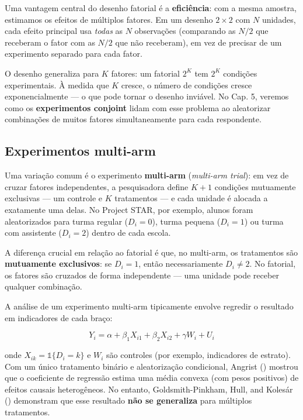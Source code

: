 \documentclass[
]{article}
\begin{document}
Uma vantagem central do desenho fatorial é a \textbf{eficiência}: com a mesma amostra, estimamos os efeitos de múltiplos fatores. Em um desenho \(2 \times 2\) com \(N\) unidades, cada efeito principal usa \emph{todas} as \(N\) observações (comparando as \(N/2\) que receberam o fator com as \(N/2\) que não receberam), em vez de precisar de um experimento separado para cada fator.

O desenho generaliza para \(K\) fatores: um fatorial \(2^K\) tem \(2^K\) condições experimentais. À medida que \(K\) cresce, o número de condições cresce exponencialmente --- o que pode tornar o desenho inviável. No Cap. 5, veremos como os \textbf{experimentos conjoint} lidam com esse problema ao aleatorizar combinações de muitos fatores simultaneamente para cada respondente.

\subsection{Experimentos multi-arm}\label{experimentos-multi-arm}

Uma variação comum é o experimento \textbf{multi-arm} (\emph{multi-arm trial}): em vez de cruzar fatores independentes, a pesquisadora define \(K+1\) condições mutuamente exclusivas --- um controle e \(K\) tratamentos --- e cada unidade é alocada a exatamente uma delas. No Project STAR, por exemplo, alunos foram aleatorizados para turma regular (\(D_i = 0\)), turma pequena (\(D_i = 1\)) ou turma com assistente (\(D_i = 2\)) dentro de cada escola.

A diferença crucial em relação ao fatorial é que, no multi-arm, os tratamentos são \textbf{mutuamente exclusivos}: se \(D_i = 1\), então necessariamente \(D_i \neq 2\). No fatorial, os fatores são cruzados de forma independente --- uma unidade pode receber qualquer combinação.

A análise de um experimento multi-arm tipicamente envolve regredir o resultado em indicadores de cada braço:

\[Y_i = \alpha + \beta_1 X_{i1} + \beta_2 X_{i2} + \gamma W_i + U_i\]

onde \(X_{ik} = \mathbb{1}\{D_i = k\}\) e \(W_i\) são controles (por exemplo, indicadores de estrato). Com um único tratamento binário e aleatorização condicional, Angrist () mostrou que o coeficiente de regressão estima uma média convexa (com pesos positivos) de efeitos causais heterogêneos. No entanto, Goldsmith-Pinkham, Hull, and Kolesár () demonstram que esse resultado \textbf{não se generaliza} para múltiplos tratamentos.
\end{document}
